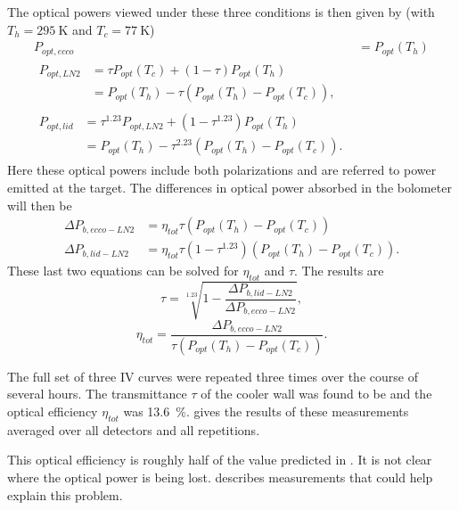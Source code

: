 The optical powers viewed under these three conditions is then given by (with $T_h = \SI{295}{\K}$ and $T_c = \SI{77}{\K}$)
\begin{align}
  P_{opt,ecco}  & = P_{opt}(T_h) \\
  \begin{split}
    P_{opt,LN2} & = \tau P_{opt}(T_c) + (1-\tau)P_{opt}(T_h) \\
              & = P_{opt}(T_h) - \tau (P_{opt}(T_h) - P_{opt}(T_c)),
  \end{split} \\
  \begin{split}
    P_{opt,lid} & = \tau^{1.23} P_{opt,LN2} + (1-\tau^{1.23})P_{opt}(T_h) \\
              & = P_{opt}(T_h) - \tau^{2.23}(P_{opt}(T_h) - P_{opt}(T_c)) .
  \end{split}
\end{align}
Here these optical powers include both polarizations and are referred to power emitted at the target.
The differences in optical power absorbed in the bolometer will then be
\begin{align}
  \Delta P_{b,ecco-LN2} & = \eta_{tot} \tau (P_{opt}(T_h) - P_{opt}(T_c)) \\
  \Delta P_{b,lid-LN2}  & = \eta_{tot} \tau (1-\tau^{1.23}) (P_{opt}(T_h) - P_{opt}(T_c)).
\end{align}
These last two equations can be solved for $\eta_{tot}$ and $\tau$. The results are
\begin{equation}
   \tau = \sqrt[1.23]{1 - \frac{\Delta P_{b,lid-LN2}}{\Delta P_{b,ecco-LN2}}},
\end{equation}
\begin{equation}
   \eta_{tot} = \frac{\Delta P_{b,ecco-LN2}}{ \tau ( P_{opt}(T_h) - P_{opt}(T_c) )} .
\end{equation}

The full set of three IV curves were repeated three times over the course of several hours.
The transmittance $\tau$ of the cooler wall was found to be  and the optical efficiency $\eta_{tot}$ was \SI{13.6}{\percent}. 
 gives the results of these measurements averaged over all detectors and all repetitions.

This optical efficiency is roughly half of the value predicted in .
It is not clear where the optical power is being lost.
 describes measurements that could help explain this problem.

